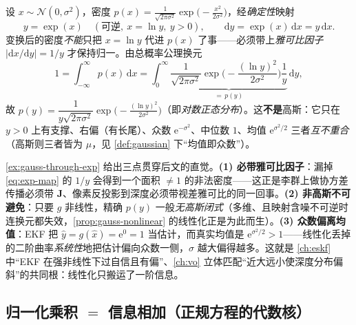\begin{example}[$y=\exp(x)$：高斯被确定性非线性掰成非高斯]\label{ex:gauss-through-exp}
设 $x\sim\mathcal{N}(0,\sigma^2)$，密度 $p(x)=\tfrac{1}{\sqrt{2\pi\sigma^2}}\exp\!\big(-\tfrac{x^2}{2\sigma^2}\big)$，经\emph{确定性}映射
\begin{equation}
  y=\exp(x)\quad(\text{可逆},\ x=\ln y,\ y>0),\qquad \mathrm{d}y=\exp(x)\,\mathrm{d}x=y\,\mathrm{d}x.
  \label{eq:exp-map}
\end{equation}
变换后的密度\emph{不能}只把 $x=\ln y$ 代进 $p(x)$ 了事——必须带上\emph{雅可比因子} $|\mathrm{d}x/\mathrm{d}y|=1/y$ 才保持归一。由总概率公理换元
\begin{equation}
  1=\int_{-\infty}^{\infty}\!p(x)\,\mathrm{d}x
   =\int_{0}^{\infty}\underbrace{\frac{1}{\sqrt{2\pi\sigma^2}}\exp\!\Big(-\frac{(\ln y)^2}{2\sigma^2}\Big)\frac{1}{y}}_{=\,p(y)}\,\mathrm{d}y,
  \label{eq:lognormal}
\end{equation}
故 $p(y)=\dfrac{1}{y\sqrt{2\pi\sigma^2}}\exp\!\big(-\tfrac{(\ln y)^2}{2\sigma^2}\big)$（即\emph{对数正态分布}）。这\textbf{不是}高斯：它只在 $y>0$ 上有支撑、右偏（有长尾）、众数 $\mathrm{e}^{-\sigma^2}$、中位数 $1$、均值 $\mathrm{e}^{\sigma^2/2}$ 三者\emph{互不重合}（高斯则三者皆为 $\mu$，见 \cref{def:gaussian} 下“均值即众数”）。
\end{example}

\begin{insight}
\cref{ex:gauss-through-exp} 给出三点贯穿后文的直觉。\textbf{(1) 必带雅可比因子}：漏掉 \cref{eq:exp-map} 的 $1/y$ 会得到一个面积 $\ne 1$ 的非法密度——这正是李群上做协方差传播必须带 $\mathbf{J}$、像素反投影到深度必须带视差雅可比的同一回事。\textbf{(2) 非高斯不可避免}：只要 $g$ 非线性，精确 $p(y)$ 一般\emph{无高斯闭式}（多维、且映射含噪不可逆时连换元都失效，\cref{prop:gauss-nonlinear} 的线性化正是为此而生）。\textbf{(3) 众数偏离均值}：EKF 把 $\hat{y}=g(\hat{x})=\mathrm{e}^{0}=1$ 当估计，而真实均值是 $\mathrm{e}^{\sigma^2/2}>1$——线性化丢掉的二阶曲率\emph{系统性}地把估计偏向众数一侧，$\sigma$ 越大偏得越多。这就是 \cref{ch:eskf} 中“EKF 在强非线性下过自信且有偏”、\cref{ch:vo} 立体匹配“近大远小使深度分布偏斜”的共同根：线性化只搬运了一阶信息。
\end{insight}

\subsection{归一化乘积 $=$ 信息相加（正规方程的代数核）}
\label{sec:est-info-add}

